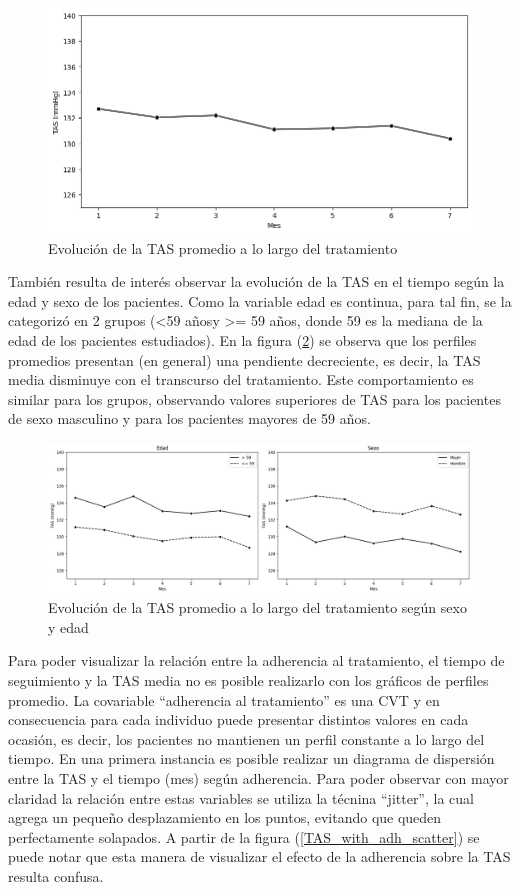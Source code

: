 \documentclass[spanish]{article}
\numberwithin{figure}{subsection}
\numberwithin{equation}{subsection}
\numberwithin{table}{subsection}
\begin{document}
\begin{figure}[H]
	\centering
	\includegraphics[scale=0.5]{img/TAS_vs_tpo.png}
	\caption{Evolución de la TAS promedio a lo largo del tratamiento}
	\label{TAS_vs_tpo}
\end{figure}

También resulta de interés observar la evolución de la TAS en el tiempo según la
edad y sexo de los pacientes. Como la variable edad es continua, para tal fin,
se la categorizó en 2 grupos (<59 añosy >= 59 años, donde 59 es la mediana de la
edad de los pacientes estudiados). En la figura (\ref{TAS_with_covs}) se observa
que los perfiles promedios presentan (en general) una pendiente decreciente, es
decir, la TAS media disminuye con el transcurso del tratamiento. Este
comportamiento es similar para los grupos, observando valores superiores de TAS
para los pacientes de sexo masculino y para los pacientes mayores de 59 años. 

\begin{figure}[H]
	\centering
	\includegraphics[scale=0.4]{img/TAS_vs_tpo_with_covs.png}
	\caption{Evolución de la TAS promedio a lo largo del tratamiento según sexo y edad}
	\label{TAS_with_covs}
\end{figure}

Para poder visualizar la relación entre la adherencia al tratamiento, el tiempo
de seguimiento y la TAS media no es posible realizarlo con los gráficos de
perfiles promedio. La covariable ``adherencia al tratamiento'' es una CVT y en
consecuencia para cada individuo puede presentar distintos valores en cada
ocasión, es decir, los pacientes no mantienen un perfil constante a lo largo del
tiempo. En una primera instancia es posible realizar un diagrama de dispersión
entre la TAS y el tiempo (mes) según adherencia. Para poder observar con mayor
claridad la relación entre estas variables se utiliza la técnina ``jitter'', la
cual agrega un pequeño desplazamiento en los puntos, evitando que queden
perfectamente solapados. A partir de la figura (\ref{TAS_with_adh_scatter}) se
puede notar que esta manera de visualizar el efecto de la adherencia sobre la
TAS resulta confusa.
\end{document}

